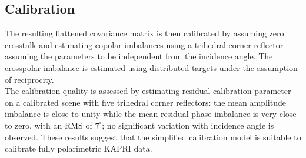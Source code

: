 \subsection{Calibration}
The resulting flattened covariance matrix is then calibrated  by assuming zero crosstalk and estimating copolar imbalances using a trihedral corner reflector assuming the parameters to be independent from the  incidence angle. The crosspolar imbalance is estimated using distributed targets under the assumption of reciprocity.\\
The calibration quality is assessed by estimating residual calibration parameter on a calibrated scene with five trihedral corner reflectors: the mean amplitude imbalance is close to unity while the mean residual phase imbalance is very close to zero, with an RMS of $7^\circ$; no significant variation with incidence angle is observed. These results suggest that the simplified calibration model\cite{Fore2015,Sarabandi1990} is suitable to calibrate fully polarimetric KAPRI data.
